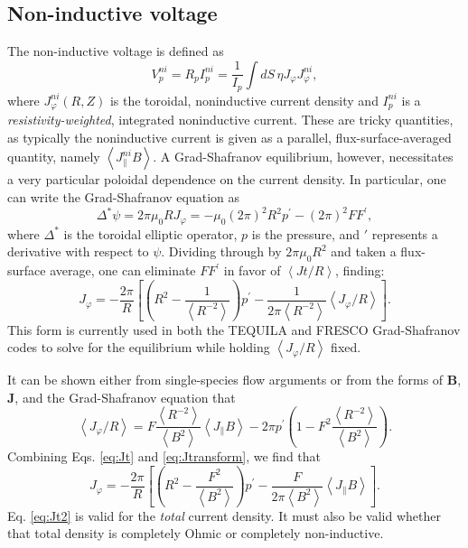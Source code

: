 \documentclass[reprint,onecolumn,amsmath,aip,pop,letterpaper, 11pt]{revtex4-1}
\newcommand{\bB}{\mathbf{B}}
\newcommand{\bJ}{\mathbf{J}}
\newcommand{\Jpar}{J_\parallel}
\newcommand{\Jt}{J_\varphi}
\newcommand{\Jtni}{J_{\varphi}^{ni}}
\newcommand{\Jpni}{J_{\parallel}^{ni}}
\newcommand{\fsa}[1]{\left\langle #1 \right\rangle}
\begin{document}
\subsection{Non-inductive voltage}
\label{sec:Vni}

The non-inductive voltage is defined as
\begin{equation}
V_p^{ni} = R_pI_p^{ni} = \frac{1}{I_p}\int dS\, \eta \Jt \Jtni,\label{eq:Vni}
\end{equation}
where $\Jtni(R,Z)$ is the toroidal, noninductive current density and $I_p^{ni}$ is a \textit{resistivity-weighted}, integrated noninductive current. These are tricky quantities, as typically the noninductive current is given as a parallel, flux-surface-averaged quantity, namely $\fsa{\Jpni B}$. A Grad-Shafranov equilibrium, however, necessitates a very particular poloidal dependence on the current density. In particular, one can write the Grad-Shafranov equation as
\begin{equation}
\Delta^*\psi = 2\pi\mu_0 R \Jt = -\mu_0 (2\pi)^2 R^2 p^\prime - (2\pi)^2 FF^\prime, \label{eq:GS}
\end{equation}
where $\Delta^*$ is the toroidal elliptic operator, $p$ is the pressure,  and $\prime$ represents a derivative with respect to $\psi$.  Dividing through by $2\pi\mu_0 R^2$ and taken a flux-surface average, one can eliminate $FF^\prime$ in favor of $\fsa{Jt/R}$, finding:
\begin{equation}
\Jt = -\frac{2\pi}{R}\left[\left(R^2 - \frac{1}{\fsa{R^{-2}}}\right)p^\prime - \frac{1}{2\pi \fsa{R^{-2}}} \fsa{\Jt/R}\right]. \label{eq:Jt}
\end{equation}
This form is currently used in both the TEQUILA and FRESCO Grad-Shafranov codes to solve for the equilibrium while holding $\fsa{\Jt/R}$ fixed.

It can be shown either from single-species flow arguments\cite{belli:2017} or from the forms of $\bB$, $\bJ$, and the Grad-Shafranov equation that
\begin{equation}
\fsa{\Jt/R} = F\frac{\fsa{R^{-2}}}{\fsa{B^2}}\fsa{\Jpar B} - 2\pi p^\prime \left(1 - F^2\frac{\fsa{R^{-2}}}{\fsa{B^2}} \right). \label{eq:Jtransform}
\end{equation}
Combining Eqs. \ref{eq:Jt} and \ref{eq:Jtransform}, we find that
\begin{equation}
\Jt = -\frac{2\pi}{R}\left[\left(R^2 - \frac{F^2}{\fsa{B^2}}\right)p^\prime - \frac{F}{2\pi \fsa{B^2}}\fsa{\Jpar B} \right]. \label{eq:Jt2}
\end{equation}
Eq. \ref{eq:Jt2} is valid for the \textit{total} current density.  It must also be valid whether that total density is completely Ohmic or completely non-inductive.  
\end{document}
